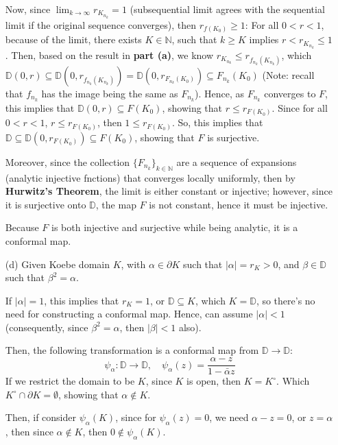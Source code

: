 \documentclass{article}
\begin{document}
\begin{itemize}
    Now, since $\lim_{k\rightarrow\infty}r_{K_{n_k}}=1$ (subsequential limit agrees with the sequential limit if the original sequence converges), then $r_{f(K_0)}\geq 1$: For all $0<r<1$, because of the limit, there exists $K\in\mathbb{N}$, such that $k\geq K$ implies $r<r_{K_{n_k}}\leq 1$. Then, based on the result in \textbf{part (a)}, we know $r_{K_{n_k}}\leq r_{f_{n_k}(K_{n_k})}$, which $\mathbb{D}(0,r)\subseteq \mathbb{D}(0,r_{f_{n_k}(K_{n_k})})=\mathbb{D}(0,r_{F_{n_k}(K_0)})\subseteq F_{n_k}(K_0)$ (Note: recall that $f_{n_k}$ has the image being the same as $F_{n_k}$).
    Hence, as $F_{n_k}$ converges to $F$, this implies that $\mathbb{D}(0,r)\subseteq F(K_0)$, showing that $r\leq r_{F(K_0)}$.
    Since for all $0<r<1$, $r\leq r_{F(K_0)}$, then $1\leq r_{F(K_0)}$.
    So, this implies that $\mathbb{D}\subseteq \mathbb{D}(0,r_{F(K_0)})\subseteq F(K_0)$, showing that $F$ is surjective.

    Moreover, since the collection $\{F_{n_k}\}_{k\in\mathbb{N}}$ are a sequence of expansions (analytic injective fnctions) that converges locally uniformly, then by \textbf{Hurwitz's Theorem}, the limit is either constant or injective; however, since it is surjective onto $\mathbb{D}$, the map $F$ is not constant, hence it must be injective.

    Because $F$ is both injective and surjective while being analytic, it is a conformal map. 

    \hfil

    \item[(d)] Given Koebe domain $K$, with $\alpha\in \partial K$ such that $|\alpha|=r_K>0$, and $\beta\in\mathbb{D}$ such that $\beta^2=\alpha$.
    
    If $|\alpha|=1$, this implies that $r_K=1$, or $\mathbb{D}\subseteq K$, which $K=\mathbb{D}$, so there's no need for constructing a conformal map.
    Hence, can assume $|\alpha|<1$ (consequently, since $\beta^2=\alpha$, then $|\beta|<1$ also).

    Then, the following transformation is a conformal map from $\mathbb{D}\rightarrow\mathbb{D}$:
    $$\psi_\alpha:\mathbb{D}\rightarrow\mathbb{D},\quad \psi_\alpha(z)=\frac{\alpha-z}{1-\bar{\alpha}z}$$
    If we restrict the domain to be $K$, since $K$ is open, then $K=K^\circ$. Which $K^\circ \cap \partial K=\emptyset$, showing that $\alpha\notin K$.

    Then, if consider $\psi_\alpha(K)$, since for $\psi_\alpha(z)=0$, we need $\alpha-z=0$, or $z=\alpha$, then since $\alpha\notin K$, then $0\notin \psi_\alpha(K)$.


\end{itemize}
\end{document}
